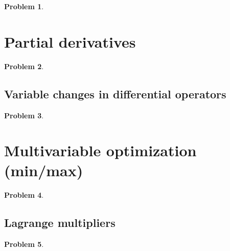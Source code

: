 \documentclass{article}
\newtheorem{problem}{Problem}
\begin{document}
\begin{problem}

\end{problem}


\section{Partial derivatives}

\begin{problem}

\end{problem}



\subsection{Variable changes in differential operators}

\begin{problem}

\end{problem}

\section{Multivariable optimization (min/max)}

\begin{problem}

\end{problem}

\subsection{Lagrange multipliers}

\begin{problem}

\end{problem}

\end{document}
